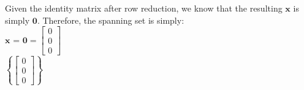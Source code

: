 \documentclass{report}
\begin{document}
\begin{center}
    Given the identity matrix after row reduction, we know that the resulting $\mathbf{x}$ is simply $\mathbf{0}$. Therefore, the spanning set is simply:\\ 
    $\mathbf{x}$ = $\mathbf{0} = \begin{bmatrix}
        0 \\
        0 \\
        0
    \end{bmatrix}$\\
    $\left\{ 
        \begin{bmatrix}
            0 \\
            0 \\
            0
        \end{bmatrix}
    \right\}$
\end{center}
\end{document}

